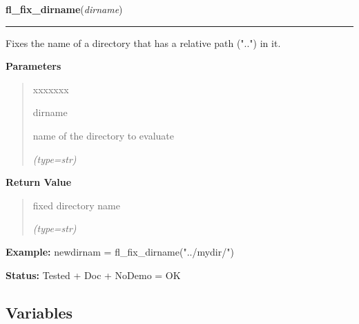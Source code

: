 \hspace{.8\funcindent}\begin{boxedminipage}{\funcwidth}

    \raggedright \textbf{fl\_fix\_dirname}(\textit{dirname})

    \vspace{-1.5ex}

    \rule{\textwidth}{0.5\fboxrule}
\setlength{\parskip}{2ex}
    Fixes the name of a directory that has a relative path ("..") in it.

\setlength{\parskip}{1ex}
      \textbf{Parameters}
      \vspace{-1ex}

      \begin{quote}
        \begin{Ventry}{xxxxxxx}

          \item[dirname]

          name of the directory to evaluate

            {\it (type=str)}

        \end{Ventry}

      \end{quote}

      \textbf{Return Value}
    \vspace{-1ex}

      \begin{quote}
      fixed directory name

      {\it (type=str)}

      \end{quote}

\textbf{Example:} newdirnam = fl\_fix\_dirname("../mydir/")



\textbf{Status:} Tested + Doc + NoDemo = OK



    \end{boxedminipage}



  \subsection{Variables}

